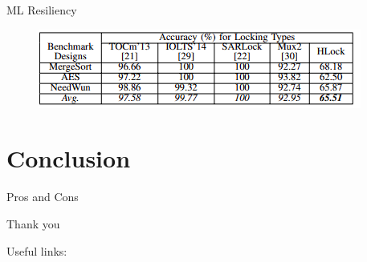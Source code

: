 \documentclass[xcolor=dvipsnames]{beamer}
\begin{document}
    \begin{frame}{ML Resiliency}

        \begin{figure}
            \includegraphics{Result_ML.PNG}
        \end{figure}
        
    \end{frame}

    \section{Conclusion}
    \begin{frame}{Pros and Cons}
        
    \end{frame}

    \begin{frame}{Thank you}

        Useful links:
        
    \end{frame}
\end{document}
